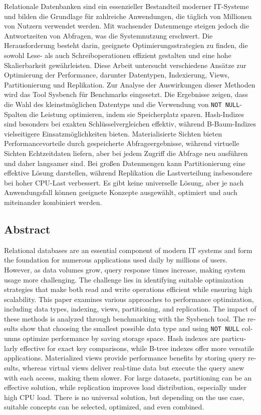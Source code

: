 Relationale Datenbanken sind ein essenzieller Bestandteil moderner IT-Systeme und bilden die Grundlage für zahlreiche Anwendungen, die täglich von Millionen von Nutzern verwendet werden.
Mit wachsender Datenmenge steigen jedoch die Antwortzeiten von Abfragen, was die Systemnutzung erschwert.
Die Herausforderung besteht darin, geeignete Optimierungsstrategien zu finden, die sowohl Lese- als auch Schreiboperationen effizient gestalten und eine hohe Skalierbarkeit gewährleisten.
Diese Arbeit untersucht verschiedene Ansätze zur Optimierung der Performance, darunter Datentypen, Indexierung, Views, Partitionierung und Replikation.
Zur Analyse der Auswirkungen dieser Methoden wird das Tool Sysbench für Benchmarks eingesetzt.
Die Ergebnisse zeigen, dass die Wahl des kleinstmöglichen Datentyps und die Verwendung von \texttt{NOT NULL}-Spalten die Leistung optimieren, indem sie Speicherplatz sparen.
Hash-Indizes sind besonders bei exakten Schlüsselvergleichen effektiv, während B-Baum-Indizes vielseitigere Einsatzmöglichkeiten bieten.
Materialisierte Sichten bieten Performancevorteile durch gespeicherte Abfrageergebnisse, während virtuelle Sichten Echtzeitdaten liefern, aber bei jedem Zugriff die Abfrage neu ausführen und daher langsamer sind.
Bei großen Datenmengen kann Partitionierung eine effektive Lösung darstellen, während Replikation die Lastverteilung insbesondere bei hoher CPU-Last verbessert.
Es gibt keine universelle Lösung, aber je nach Anwendungsfall können geeignete Konzepte ausgewählt, optimiert und auch miteinander kombiniert werden.

{
  \begin{otherlanguage}{english}
    \section*{Abstract}
    Relational databases are an essential component of modern IT systems and form the foundation for numerous applications used daily by millions of users.
    However, as data volumes grow, query response times increase, making system usage more challenging.
    The challenge lies in identifying suitable optimization strategies that make both read and write operations efficient while ensuring high scalability.
    This paper examines various approaches to performance optimization, including data types, indexing, views, partitioning, and replication.
    The impact of these methods is analyzed through benchmarking with the Sysbench tool.
    The results show that choosing the smallest possible data type and using \texttt{NOT NULL} columns optimize performance by saving storage space.
    Hash indexes are particularly effective for exact key comparisons, while B-tree indexes offer more versatile applications.
    Materialized views provide performance benefits by storing query results, whereas virtual views deliver real-time data but execute the query anew with each access, making them slower.
    For large datasets, partitioning can be an effective solution, while replication improves load distribution, especially under high CPU load.
    There is no universal solution, but depending on the use case, suitable concepts can be selected, optimized, and even combined.
  \end{otherlanguage}
}
